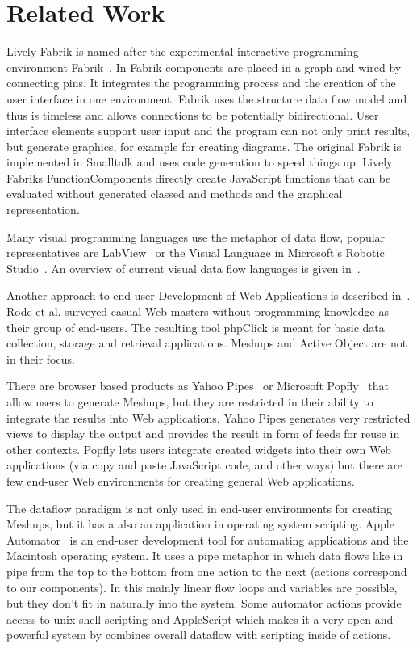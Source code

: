 \documentclass[pdftex, times, 10pt, twocolumn]{article}
\begin{document}
\section{Related Work}
Lively Fabrik is named after the experimental interactive programming environment Fabrik~\cite{Ingalls1988FVP,Ludolph1988FPE}. In Fabrik components are placed in a graph and wired by connecting pins. It integrates the programming process and the creation of the user interface in one environment. Fabrik uses the structure data flow model and thus is timeless and allows connections to be potentially bidirectional. User interface elements support user input and the program can not only print results, but generate graphics, for example for creating diagrams. The original Fabrik is implemented in Smalltalk and uses code generation to speed things up. Lively Fabriks FunctionComponents directly create JavaScript functions that can be evaluated without generated classed and methods and the graphical representation.  

Many visual programming languages use the metaphor of data flow, popular representatives are LabView~\cite{Bitter2006LAP} or the Visual Language in Microsoft's Robotic Studio~\cite{Morgan2008PMR}. An overview of current visual data flow languages is given in~\cite{Johnston2004ADP}. 

Another approach to end-user Development of Web Applications is described in~\cite{Rode2006EUD}. Rode et al. surveyed casual Web masters without programming knowledge as their group of end-users. The resulting tool phpClick is meant for basic data collection, storage and retrieval applications. Meshups and Active Object are not in their focus. 

There are browser based products as Yahoo Pipes~\cite{YahooPipes} or Microsoft Popfly~\cite{MicrosoftPopfly} that allow users to generate Meshups, but they are restricted in their ability to integrate the results into Web applications. Yahoo Pipes generates very restricted views to display the output and provides the result in form of feeds for reuse in other contexts. Popfly lets users integrate created widgets into their own Web applications (via copy and paste JavaScript code, and other ways) but there are few end-user Web environments for creating general Web applications. 

The dataflow paradigm is not only used in end-user environments for creating Meshups, but it has a also an application in operating system scripting. Apple Automator~\cite{AppleAutomator} is an end-user development tool for automating applications and the Macintosh operating system. It uses a pipe metaphor in which data flows like in pipe from the top to the bottom from one action to the next (actions correspond to our components). In this mainly linear flow loops and variables are possible, but they don't fit in naturally into the system. Some automator actions provide access to unix shell scripting and AppleScript which makes it a very open and powerful system by combines overall dataflow with scripting inside of actions. 
\end{document}
